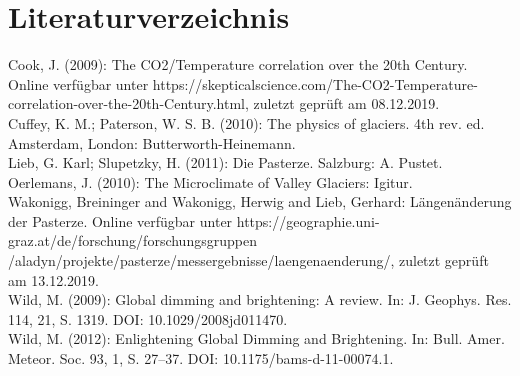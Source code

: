 \documentclass[11pt,a4paper]{article}
\begin{document}
\pagebreak
\section{Literaturverzeichnis}

Cook, J. (2009): The CO2/Temperature correlation over the 20th Century. Online verfügbar unter https://skepticalscience.com/The-CO2-Temperature-correlation-over-the-20th-Century.html, zuletzt geprüft am 08.12.2019.\\

Cuffey, K. M.; Paterson, W. S. B. (2010): The physics of glaciers. 4th rev. ed. Amsterdam, London: Butterworth-Heinemann.\\

Lieb, G. Karl; Slupetzky, H. (2011): Die Pasterze. Salzburg: A. Pustet.\\

Oerlemans, J. (2010): The Microclimate of Valley Glaciers: Igitur.\\

Wakonigg, Breininger and Wakonigg, Herwig and Lieb, Gerhard: Längenänderung der Pasterze. Online verfügbar unter https://geographie.uni-graz.at/de/forschung/forschungsgruppen /aladyn/projekte/pasterze/messergebnisse/laengenaenderung/, zuletzt geprüft am 13.12.2019.\\

Wild, M. (2009): Global dimming and brightening: A review. In: J. Geophys. Res. 114, 21, S. 1319. DOI: 10.1029/2008jd011470.\\

Wild, M. (2012): Enlightening Global Dimming and Brightening. In: Bull. Amer. Meteor. Soc. 93, 1, S. 27–37. DOI: 10.1175/bams-d-11-00074.1.
\end{document}
